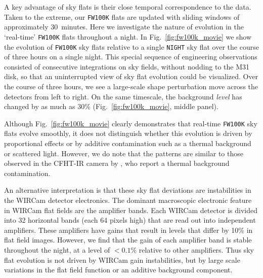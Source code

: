 \documentclass[iop,tighten]{emulateapj}
\newcommand{\Fig}[1]{Fig.~\ref{fig:#1}}  %
\begin{document}
A key advantage of sky flats is their close temporal correspondence to the data.
Taken to the extreme, our \texttt{FW100K} flats are updated with sliding windows of approximately 30~minutes.
Here we investigate the nature of evolution in the `real-time' \texttt{FW100K} flats throughout a night.
In \Fig{fw100k_movie} we show the evolution of \texttt{FW100K} sky flats relative to a single \texttt{NIGHT} sky flat over the course of three hours on a single night.
This special sequence of engineering observations consisted of consecutive integrations on sky fields, without nodding to the M31 disk, so that an uninterrupted view of sky flat evolution could be visualized.
Over the course of three hours, we see a large-scale shape perturbation move across the detectors from left to right.
On the same timescale, the background \emph{level} has changed by as much as 30\% (\Fig{fw100k_movie}, middle panel).

Although \Fig{fw100k_movie} clearly demonstrates that real-time \texttt{FW100K} sky flats evolve smoothly, it does not distinguish whether this evolution is driven by proportional effects or by additive contamination such as a thermal background or scattered light.
However, we do note that the patterns are similar to those observed in the CFHT-IR camera by \cite{Vaduvescu:2004}, who report a thermal background contamination.



An alternative interpretation is that these sky flat deviations are instabilities in the WIRCam detector electronics.
The dominant macroscopic electronic feature in WIRCam flat fields are the amplifier bands.
Each WIRCam detector is divided into 32 horizontal bands (each 64 pixels high) that are read out into independent amplifiers.
These amplifiers have gains that result in levels that differ by 10\% in flat field images.
However, we find that the gain of each amplifier band is stable throughout the night, at a level of $<0.1\%$ relative to other amplifiers.
Thus sky flat evolution is not driven by WIRCam gain instabilities, but by large scale variations in the flat field function or an additive background component.
\end{document}
